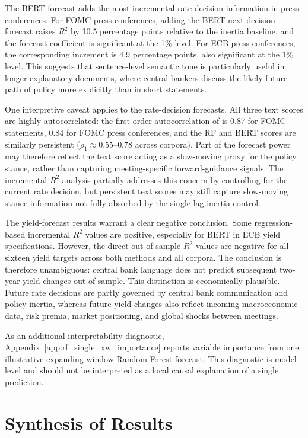 The BERT forecast adds the most incremental rate-decision information
in press conferences. For FOMC press conferences, adding the BERT
next-decision forecast raises $R^2$ by 10.5 percentage points relative to the
inertia baseline, and the forecast coefficient is significant at the 1\%
level. For ECB press conferences, the corresponding increment is 4.9
percentage points, also significant at the 1\% level. This suggests that
sentence-level semantic tone is particularly useful in longer explanatory
documents, where central bankers discuss the likely future path of policy more
explicitly than in short statements.

One interpretive caveat applies to the rate-decision forecasts. All three text
scores are highly autocorrelated: the first-order autocorrelation of
\netscore{} is 0.87 for FOMC statements, 0.84 for FOMC press conferences, and
the RF and BERT scores are similarly persistent ($\rho_1 \approx 0.55$--$0.78$
across corpora). Part of the forecast power may therefore reflect the text
score acting as a slow-moving proxy for the policy stance, rather than
capturing meeting-specific forward-guidance signals. The incremental $R^2$
analysis partially addresses this concern by controlling for the current rate
decision, but persistent text scores may still capture slow-moving stance
information not fully absorbed by the single-lag inertia control.

The yield-forecast results warrant a clear negative conclusion. Some
regression-based incremental $R^2$ values are positive, especially for BERT in
ECB yield specifications. However, the direct out-of-sample $R^2$ values are
negative for all sixteen yield targets across both methods and all corpora. The
conclusion is therefore unambiguous: central bank language does not predict
subsequent two-year yield changes out of sample. This distinction is
economically plausible. Future rate decisions are partly governed by central
bank communication and policy inertia, whereas future yield changes also
reflect incoming macroeconomic data, risk premia, market positioning, and
global shocks between meetings.

As an additional interpretability diagnostic, Appendix~\ref{app:rf_single_xw_importance}
reports variable importance from one illustrative expanding-window Random Forest
forecast. This diagnostic is model-level and should not be interpreted as a local
causal explanation of a single prediction.

\section{Synthesis of Results}
\label{sec:res_synthesis_new}

